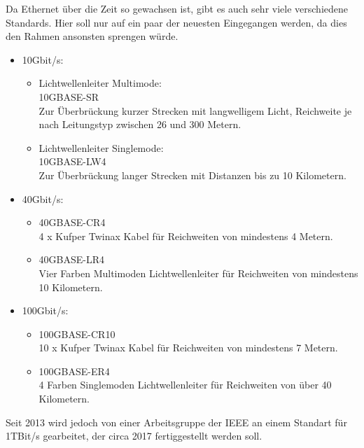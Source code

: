 \documentclass[11pt,a4paper]{report}
\begin{document}
Da Ethernet über die Zeit so gewachsen ist, gibt es auch sehr viele verschiedene Standards. Hier soll nur auf ein paar der neuesten Eingegangen werden, da dies den Rahmen ansonsten sprengen würde.\\
\begin{itemize}
\item 10Gbit/s:
\begin{itemize}
\item Lichtwellenleiter Multimode:\\
10GBASE-SR\\
Zur Überbrückung kurzer Strecken mit langwelligem Licht, Reichweite je nach Leitungstyp zwischen 26 und 300 Metern.
\item Lichtwellenleiter Singlemode:\\
10GBASE-LW4\\
Zur Überbrückung langer Strecken mit Distanzen bis zu 10 Kilometern.
\end{itemize}
\item 40Gbit/s:
\begin{itemize}
\item 40GBASE-CR4\\
4 x Kufper Twinax Kabel für Reichweiten von mindestens 4 Metern.
\item 40GBASE-LR4\\
Vier Farben Multimoden Lichtwellenleiter für Reichweiten von mindestens 10 Kilometern.
\end{itemize}
\item 100Gbit/s:
\begin{itemize}
\item 100GBASE-CR10\\
10 x Kufper Twinax Kabel für Reichweiten von mindestens 7 Metern.
\item 100GBASE-ER4\\
4 Farben Singlemoden Lichtwellenleiter für Reichweiten von über 40 Kilometern.
\end{itemize}
\end{itemize}
Seit 2013 wird jedoch von einer Arbeitsgruppe der IEEE an einem Standart für 1TBit/s gearbeitet, der circa 2017 fertiggestellt werden soll.\\
\end{document}

